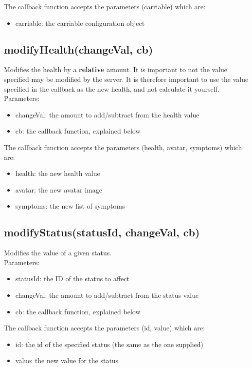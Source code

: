 \documentclass[a4paper,12pt]{article}
\begin{document}
The callback function accepts the parameters (carriable) which are:
\begin{itemize}
	\setlength\itemsep{0em}
	\item carriable: the carriable configuration object
\end{itemize}

\subsection*{modifyHealth(changeVal, cb)}
Modifies the health by a \textbf{relative} amount. It is important to not the value specified may be modified by the server.
It is therefore important to use the value specified in the callback as the new health, and not calculate it yourself.\\
Parameters:
\begin{itemize}
	\setlength\itemsep{0em}
	\item changeVal: the amount to add/subtract from the health value
	\item cb: the callback function, explained below
\end{itemize}

The callback function accepts the parameters (health, avatar, symptoms) which are:
\begin{itemize}
	\setlength\itemsep{0em}
	\item health: the new health value
	\item avatar: the new avatar image
	\item symptoms: the new list of symptoms
\end{itemize}

\subsection*{modifyStatus(statusId, changeVal, cb)}
Modifies the value of a given status.\\
Parameters:
\begin{itemize}
	\setlength\itemsep{0em}
	\item statusId: the ID of the status to affect
	\item changeVal: the amount to add/subtract from the status value
	\item cb: the callback function, explained below
\end{itemize}

The callback function accepts the parameters (id, value) which are:
\begin{itemize}
	\setlength\itemsep{0em}
	\item id: the id of the specified status (the same as the one supplied)
	\item value: the new value for the status
\end{itemize}
\end{document}
